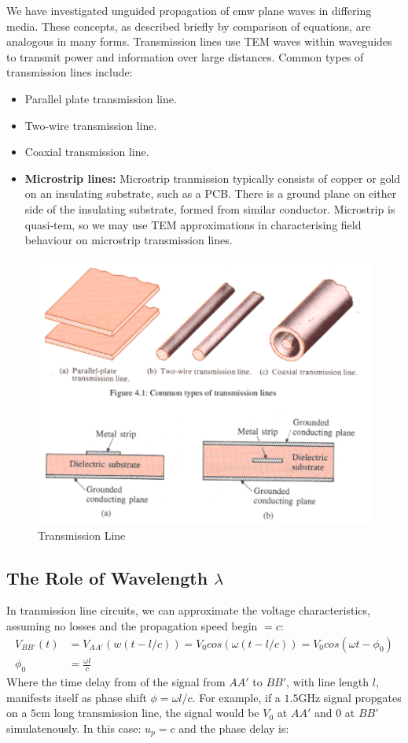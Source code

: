 \documentclass{book}
\begin{document}
We have investigated unguided propagation of emw plane waves in differing media. These concepts, as described briefly by comparison of equations, are analogous in many forms. Transmission lines use TEM waves within waveguides to transmit power and information over large distances. Common types of transmission lines include:

\begin{itemize}
	\item Parallel plate transmission line.
	\item Two-wire transmission line.
	\item Coaxial transmission line. 
	\item \textbf{Microstrip lines:} Microstrip tranmission typically consists of copper or gold on an insulating substrate, such as a PCB. There is a ground plane on either side of the insulating substrate, formed from similar conductor. Microstrip is quasi-tem, so we may use TEM approximations in characterising field behaviour on microstrip transmission lines.
\end{itemize} 

\begin{figure}[h]
	\centering
	\includegraphics[width=0.3\linewidth]{Screenshots/transmission_line}
	\caption{Transmission Line}
	\label{fig:transmissionline}
\end{figure}

\subsection{The Role of Wavelength $\lambda$}

In tranmission line circuits, we can approximate the voltage characteristics, assuming no losses and the propagation speed begin $=c$:
\begin{align*}
	V_{BB'} (t) &= V_{AA'}(w(t-l/c)) = V_0 cos(\omega(t-l/c)) = V_0 cos(\omega t - \phi_0) \\
	\phi_0 &= \frac{\omega l}{c}
\end{align*}
Where the time delay from of the signal from $AA'$ to $BB'$, with line length $l$, manifests itself as phase shift $\phi=\omega l /c$. For example, if a $1.5$GHz signal propgates on a $5$cm long transmission line, the signal would be $V_0$ at $AA'$ and $0$ at $BB'$ simulatenously. In this case: $u_p = c$ and the phase delay is:
\end{document}
